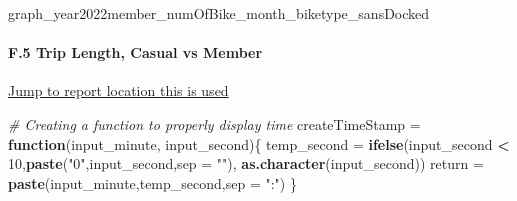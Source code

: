 \documentclass[
]{article}
\newenvironment{Shaded}{\begin{snugshade}}{\end{snugshade}}
\newcommand{\AttributeTok}[1]{\textcolor[rgb]{0.13,0.29,0.53}{#1}}
\newcommand{\CommentTok}[1]{\textcolor[rgb]{0.56,0.35,0.01}{\textit{#1}}}
\newcommand{\ControlFlowTok}[1]{\textcolor[rgb]{0.13,0.29,0.53}{\textbf{#1}}}
\newcommand{\DecValTok}[1]{\textcolor[rgb]{0.00,0.00,0.81}{#1}}
\newcommand{\FunctionTok}[1]{\textcolor[rgb]{0.13,0.29,0.53}{\textbf{#1}}}
\newcommand{\NormalTok}[1]{#1}
\newcommand{\OtherTok}[1]{\textcolor[rgb]{0.56,0.35,0.01}{#1}}
\newcommand{\SpecialCharTok}[1]{\textcolor[rgb]{0.81,0.36,0.00}{\textbf{#1}}}
\newcommand{\StringTok}[1]{\textcolor[rgb]{0.31,0.60,0.02}{#1}}
\begin{document}
\begin{Shaded}
\begin{Highlighting}[]
\NormalTok{graph\_year2022member\_numOfBike\_month\_biketype\_sansDocked}
\end{Highlighting}
\end{Shaded}

\hypertarget{f.5-trip-length-casual-vs-member}{%
\paragraph{F.5 Trip Length, Casual vs
Member}\label{f.5-trip-length-casual-vs-member}}

\protect\hyperlink{Ref5}{Jump to report location this is used}

\begin{Shaded}
\begin{Highlighting}[]
\CommentTok{\# Creating a function to properly display time}
\NormalTok{createTimeStamp }\OtherTok{=} \ControlFlowTok{function}\NormalTok{(input\_minute, input\_second)\{}
\NormalTok{  temp\_second }\OtherTok{=} \FunctionTok{ifelse}\NormalTok{(input\_second }\SpecialCharTok{\textless{}} \DecValTok{10}\NormalTok{,}\FunctionTok{paste}\NormalTok{(}\StringTok{"0"}\NormalTok{,input\_second,}\AttributeTok{sep =} \StringTok{""}\NormalTok{),}
    \FunctionTok{as.character}\NormalTok{(input\_second))}
\NormalTok{  return }\OtherTok{=} \FunctionTok{paste}\NormalTok{(input\_minute,temp\_second,}\AttributeTok{sep =} \StringTok{":"}\NormalTok{)}
\NormalTok{\}}


\end{Highlighting}
\end{Shaded}
\end{document}
